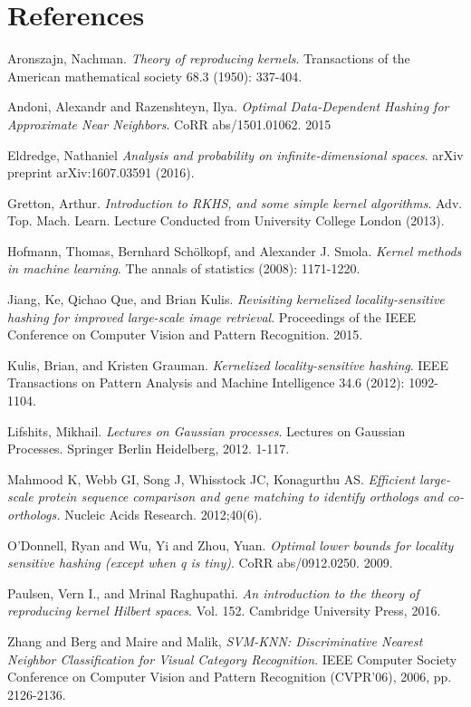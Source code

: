 \documentclass[twoside,11pt]{homework}
\begin{document}
\section*{References}
\beginrefs

 Aronszajn, Nachman. \emph{Theory of reproducing kernels}. Transactions of the American mathematical society 68.3 (1950): 337-404.

 Andoni, Alexandr and Razenshteyn, Ilya. \emph{Optimal Data-Dependent Hashing for Approximate Near Neighbors}. CoRR abs/1501.01062. 2015

 Eldredge, Nathaniel \emph{Analysis and probability on infinite-dimensional spaces}. arXiv preprint arXiv:1607.03591 (2016).

 Gretton, Arthur. \emph{Introduction to RKHS, and some simple kernel algorithms}. Adv. Top. Mach. Learn. Lecture Conducted from University College London (2013).

 Hofmann, Thomas, Bernhard Schölkopf, and Alexander J. Smola. \emph{Kernel methods in machine learning}. The annals of statistics (2008): 1171-1220.

 Jiang, Ke, Qichao Que, and Brian Kulis. \emph{Revisiting kernelized locality-sensitive hashing for improved large-scale image retrieval}. Proceedings of the IEEE Conference on Computer Vision and Pattern Recognition. 2015.
  
 Kulis, Brian, and Kristen Grauman. \emph{Kernelized locality-sensitive hashing}. IEEE Transactions on Pattern Analysis and Machine Intelligence 34.6 (2012): 1092-1104.

 Lifshits, Mikhail. \emph{Lectures on Gaussian processes}. Lectures on Gaussian Processes. Springer Berlin Heidelberg, 2012. 1-117.

 Mahmood K, Webb GI, Song J, Whisstock JC, Konagurthu AS. \emph{Efficient large-scale protein sequence comparison and gene matching to identify orthologs and co-orthologs.} Nucleic Acids Research. 2012;40(6).

 O'Donnell, Ryan and Wu, Yi and Zhou, Yuan. \emph{Optimal lower bounds for locality sensitive hashing (except when q is tiny)}. CoRR abs/0912.0250.  2009. 

 Paulsen, Vern I., and Mrinal Raghupathi. \emph{An introduction to the theory of reproducing kernel Hilbert spaces}. Vol. 152. Cambridge University Press, 2016. 

 Zhang and Berg and Maire and Malik, \emph{SVM-KNN: Discriminative Nearest Neighbor Classification for Visual Category Recognition}. IEEE Computer Society Conference on Computer Vision and Pattern Recognition (CVPR'06), 2006, pp. 2126-2136.


\endrefs
\end{document}
